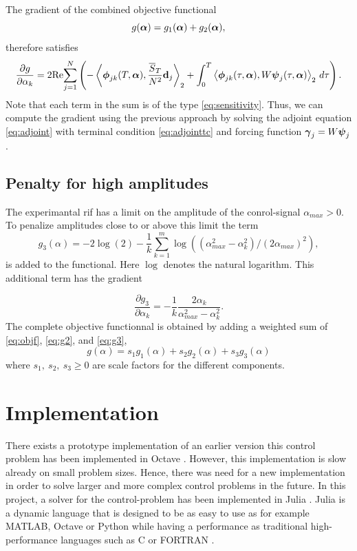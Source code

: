 \documentclass[11pt]{article}
\begin{document}
The gradient of the combined objective functional
\[
g(\boldsymbol{\alpha}) = g_1(\boldsymbol{\alpha}) + g_2(\boldsymbol{\alpha}),
\]
therefore satisfies
\[
\frac{\partial g}{\partial \alpha_k} = 2 {\rm Re}\! \sum_{j=1}^N \left(
%
-\left\langle\phib_{jk}(T,\alphab), \frac{\overline{S}_T}{N^2} \db_j \right\rangle_2 +
%
\int_0^T \left\langle \phib_{jk}(\tau,\alphab), W\psib_j(\tau,\alphab)\right\rangle_2\, d\tau \right).
\]
Note that each term in the sum is of the type \eqref{eq:sensitivity}. Thus, we can compute the
gradient using the previous approach by solving the adjoint equation \eqref{eq:adjoint} with
terminal condition \eqref{eq:adjointtc} and forcing function $\boldsymbol{\gamma}_j = W \boldsymbol{\psi}_j$.

   
\subsection{Penalty for high amplitudes}\label{subsec:penalty}

The experimantal rif has a limit on the amplitude of the conrol-signal $\alpha_{max} > 0$. To penalize amplitudes close to or above this limit the term
%
\begin{equation}\label{eq:g3}
g_3(\alpha) = -2\log(2) - \frac{1}{k}\sum_{k=1}^m \log((\alpha_{max}^2-\alpha_k^2)/(2\alpha_{max})^2),
\end{equation}
%
is added to the functional. Here $\log$ denotes the natural logarithm. This additional term has the gradient

\begin{equation}\label{eq:g3grad}
\frac{\partial g_3}{\partial \alpha_k} = -\frac{1}{k} \frac{2\alpha_k}{\alpha_{max}^2-\alpha_k^2}.
\end{equation}
The complete objective functionnal is obtained by adding a weighted sum of \eqref{eq:objf}, \eqref{eq:g2}, and \eqref{eq:g3},
%
\begin{equation}
g(\alpha) = s_1 g_1(\alpha) + s_2 g_2(\alpha) + s_3 g_3(\alpha) 
\end{equation}
%
where $s_1,  \ s_2, \ s_3 \geq 0 $ are scale factors  for the different components.

\section{Implementation}

There exists a prototype implementation of an earlier version this control problem has been implemented in Octave \cite{octave}. 
However, this implementation is slow already on small problem sizes. 
Hence, there was need for a new implementation in order to solve larger and more complex control problems in the future. 
In this project, a solver for the control-problem has been implemented in Julia \cite{juliaDoc}. Julia is a dynamic language that is designed to be as easy to use as for example MATLAB, Octave or Python while having a performance as traditional high-performance languages such as  C \cite{} or FORTRAN \cite{fortran}. 
\end{document}
